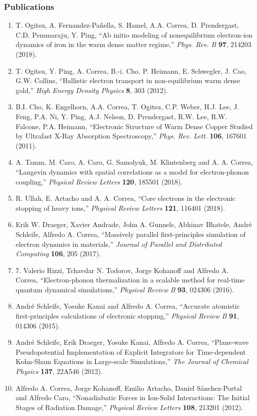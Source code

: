 \subsubsection*{Publications}
\begin{enumerate}
    \item T. Ogitsu, A. Fernandez-Pañella, S. Hamel, A.A. Correa, D. Prendergast, C.D. Pemmaraju, Y. Ping, “Ab initio modeling of nonequilibrium electron-ion dynamics of iron in the warm dense matter regime,” {\it Phys. Rev. B} {\bf 97}, 214203 (2018).
    \item T. Ogitsu, Y. Ping, A. Correa, B.-i. Cho, P. Heimann, E. Schwegler, J. Cao, G.W. Collins, “Ballistic electron transport in non-equilibrium warm dense gold,” {\it High Energy Density Physics} {\bf 8}, 303 (2012).
    \item B.I. Cho, K. Engelhorn, A.A. Correa, T. Ogitsu, C.P. Weber, H.J. Lee, J. Feng, P.A. Ni, Y. Ping, A.J. Nelson, D. Prendergast, R.W. Lee, R.W. Falcone, P.A. Heimann, “Electronic Structure of Warm Dense Copper Studied by Ultrafast X-Ray Absorption Spectroscopy,” {\it Phys. Rev. Lett.} {\bf 106}, 167601 (2011).
    \item A. Tamm, M. Caro, A. Caro, G. Samolyuk, M. Klintenberg and A. A. Correa, “Langevin dynamics with spatial correlations as a model for electron-phonon coupling,” {\it Physical Review Letters} {\bf 120}, 185501 (2018).
    \item R. Ullah, E. Artacho and A. A. Correa, “Core electrons in the electronic stopping of heavy ions,” {\it Physical Review Letters} {\bf 121}, 116401 (2018).
    \item Erik W. Draeger, Xavier Andrade, John A. Gunnels, Abhinav Bhatele, André Schleife, Alfredo A. Correa, “Massively parallel first-principles simulation of electron dynamics in materials,” {\it Journal of Parallel and Distributed Computing} {\bf 106}, 205 (2017).
    \item 7.	Valerio Rizzi, Tchavdar N. Todorov, Jorge Kohanoff and Alfredo A. Correa, “Electron-phonon thermalization in a scalable method for real-time quantum dynamical simulations,” {\it Physical Review B} {\bf 93}, 024306 (2016).
    \item André Schleife, Yosuke Kanai and Alfredo A. Correa, “Accurate atomistic first-principles calculations of electronic stopping,” {\it Physical Review B} {\bf 91}, 014306 (2015).
    \item André Schleife, Erik Draeger, Yosuke Kanai, Alfredo A. Correa, “Plane-wave Pseudopotential Implementation of Explicit Integrators for Time-dependent Kohn-Sham Equations in Large-scale Simulations,” {\it The Journal of Chemical Physics} {\bf 137}, 22A546 (2012).
    \item Alfredo A. Correa, Jorge Kohanoff, Emilio Artacho, Daniel Sánchez-Portal and Alfredo Caro, “Nonadiabatic Forces in Ion-Solid Interactions: The Initial Stages of Radiation Damage,” {\it Physical Review Letters} {\bf 108}, 213201 (2012).

\end{enumerate}

